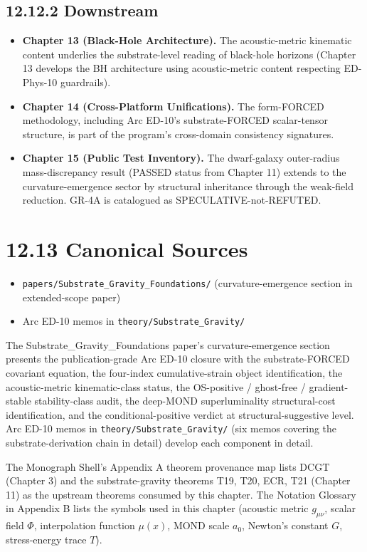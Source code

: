 \documentclass[11pt]{book}
\begin{document}
\subsection{12.12.2 Downstream}

\begin{itemize}
\item \textbf{Chapter 13 (Black-Hole Architecture).} The acoustic-metric kinematic content underlies the substrate-level reading of black-hole horizons (Chapter 13 develops the BH architecture using acoustic-metric content respecting ED-Phys-10 guardrails).
\item \textbf{Chapter 14 (Cross-Platform Unifications).} The form-FORCED methodology, including Arc ED-10's substrate-FORCED scalar-tensor structure, is part of the program's cross-domain consistency signatures.
\item \textbf{Chapter 15 (Public Test Inventory).} The dwarf-galaxy outer-radius mass-discrepancy result (PASSED status from Chapter 11) extends to the curvature-emergence sector by structural inheritance through the weak-field reduction. GR-4A is catalogued as SPECULATIVE-not-REFUTED.
\end{itemize}

\section{12.13 Canonical Sources}

\begin{itemize}
\item \texttt{papers/Substrate\_Gravity\_Foundations/} (curvature-emergence section in extended-scope paper)
\item Arc ED-10 memos in \texttt{theory/Substrate\_Gravity/}
\end{itemize}

The Substrate\_Gravity\_Foundations paper's curvature-emergence section presents the publication-grade Arc ED-10 closure with the substrate-FORCED covariant equation, the four-index cumulative-strain object identification, the acoustic-metric kinematic-class status, the OS-positive / ghost-free / gradient-stable stability-class audit, the deep-MOND superluminality structural-cost identification, and the conditional-positive verdict at structural-suggestive level. Arc ED-10 memos in \texttt{theory/Substrate\_Gravity/} (six memos covering the substrate-derivation chain in detail) develop each component in detail.

The Monograph Shell's Appendix A theorem provenance map lists DCGT (Chapter 3) and the substrate-gravity theorems T19, T20, ECR, T21 (Chapter 11) as the upstream theorems consumed by this chapter. The Notation Glossary in Appendix B lists the symbols used in this chapter (acoustic metric $g_{\mu\nu}$, scalar field $\Phi$, interpolation function $\mu(x)$, MOND scale $a_0$, Newton's constant $G$, stress-energy trace $T$).
\end{document}
